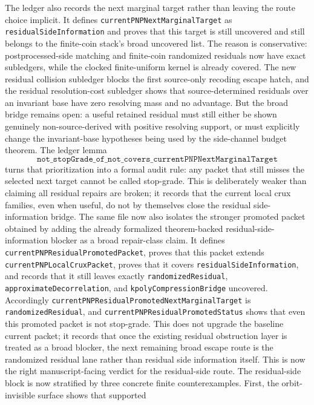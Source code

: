 \documentclass[11pt]{article}
\theoremstyle{remark}
\begin{document}
The ledger also records the next marginal target rather than leaving the route
choice implicit.  It defines \texttt{currentPNPNextMarginalTarget} as
\texttt{residualSideInformation} and proves that this target is still uncovered
and still belongs to the finite-coin stack's broad uncovered list.  The reason
is conservative: postprocessed-side matching and finite-coin randomized
residuals now have exact subledgers, while the clocked finite-uniform kernel is
already covered.  The new residual collision subledger blocks the first
source-only recoding escape hatch, and the residual resolution-cost subledger
shows that source-determined residuals over an invariant base have zero
resolving mass and no advantage.  But the broad bridge remains open: a useful
retained residual must still either be shown genuinely non-source-derived with
positive resolving support, or must explicitly change the invariant-base
hypotheses being used by the side-channel budget theorem.
The ledger lemma
\[
  \texttt{not\_stopGrade\_of\_not\_covers\_currentPNPNextMarginalTarget}
\]
turns that prioritization into a formal audit rule: any packet that still
misses the selected next target cannot be called stop-grade.  This is
deliberately weaker than claiming all residual repairs are broken; it records
that the current local crux families, even when useful, do not by themselves
close the residual side-information bridge.
The same file now also isolates the stronger promoted packet obtained by
adding the already formalized theorem-backed residual-side-information blocker
as a broad repair-class claim.  It defines
\texttt{currentPNPResidualPromotedPacket}, proves that this packet extends
\texttt{currentPNPLocalCruxPacket}, proves that it covers
\texttt{residualSideInformation}, and records that it still leaves exactly
\texttt{randomizedResidual}, \texttt{approximateDecorrelation}, and
\texttt{kpolyCompressionBridge} uncovered.  Accordingly
\texttt{currentPNPResidualPromotedNextMarginalTarget} is
\texttt{randomizedResidual}, and
\texttt{currentPNPResidualPromotedStatus} shows that even this promoted packet
is not stop-grade.  This does not upgrade the baseline current packet; it
records that once the existing residual obstruction layer is treated as a
broad blocker, the next remaining broad escape route is the randomized
residual lane rather than residual side information itself.
This is now the right manuscript-facing verdict for the residual-side route.
The residual-side block is now stratified by three concrete finite
counterexamples.  First, the orbit-invisible surface shows that supported
\end{document}
